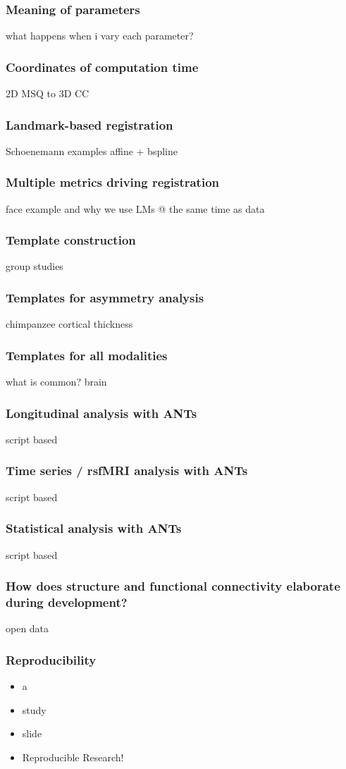 \documentclass[18pt]{beamer}
\begin{document}
\begin{frame}
\frametitle{Meaning of parameters}
what happens when i vary each parameter?
\end{frame}

\begin{frame}
\frametitle{Coordinates of computation time}
2D MSQ to 3D CC
\end{frame}

\begin{frame}
\frametitle{Landmark-based registration}
Schoenemann examples affine + bspline 
\end{frame}

\begin{frame}
\frametitle{Multiple metrics driving registration}
face example and why we use LMs @ the same time as data 
\end{frame}

\begin{frame}
\frametitle{Template construction}
group studies 
\end{frame}

\begin{frame}
\frametitle{Templates for asymmetry analysis}
chimpanzee cortical thickness 
\end{frame}

\begin{frame}
\frametitle{Templates for all modalities}
what is common?  brain
\end{frame}

\begin{frame}
\frametitle{Longitudinal analysis with ANTs}
script based 
\end{frame}

\begin{frame}
\frametitle{Time series / rsfMRI analysis with ANTs}
script based 
\end{frame}

\begin{frame}
\frametitle{Statistical analysis with ANTs}
script based 
\end{frame}

\begin{frame}
\frametitle{How does structure and functional connectivity elaborate during development?}
open data
\end{frame}


\begin{frame}
\frametitle{Reproducibility}
\Huge
\begin{itemize}
\item a
\pause
\item study
\pause
\item slide
\pause
\item Reproducible Research!
\end{itemize}
\end{frame}
\end{document}
